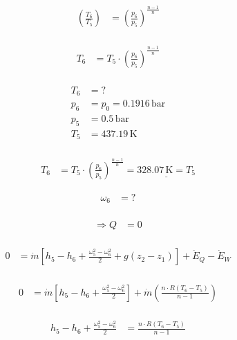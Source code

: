 \begin{align*}
\left( \frac{T_6}{T_5} \right) &= \left( \frac{p_6}{p_5} \right)^{\frac{n-1}{n}} \\
\end{align*}

\begin{align*}
T_6 &= T_5 \cdot \left( \frac{p_6}{p_5} \right)^{\frac{n-1}{n}} \\
\end{align*}

\begin{align*}
T_6 &= ? \\
p_6 &= p_0 = 0.1916 \, \text{bar} \\
p_5 &= 0.5 \, \text{bar} \\
T_5 &= 437.19 \, \text{K} \\
\end{align*}

\begin{align*}
T_6 &= T_5 \cdot \left( \frac{p_6}{p_5} \right)^{\frac{n-1}{n}} = \underline{328.07 \, \text{K} = T_5}
\end{align*}

\begin{align*}
\omega_6 &= ? \\
\end{align*}


\begin{align*}
\Rightarrow Q &= 0 \\
\end{align*}



\begin{align*}
0 &= \dot{m} \left[ h_5 - h_6 + \frac{\omega_5^2 - \omega_6^2}{2} + g(z_2 - z_1) \right] + \dot{E}_Q - \dot{E}_W \\
\end{align*}

\begin{align*}
0 &= \dot{m} \left[ h_5 - h_6 + \frac{\omega_5^2 - \omega_6^2}{2} \right] + \dot{m} \left( \frac{n \cdot R (T_6 - T_5)}{n-1} \right) \\
\end{align*}

\begin{align*}
h_5 - h_6 + \frac{\omega_5^2 - \omega_6^2}{2} &= \frac{n \cdot R (T_6 - T_5)}{n-1} \\
\end{align*}


